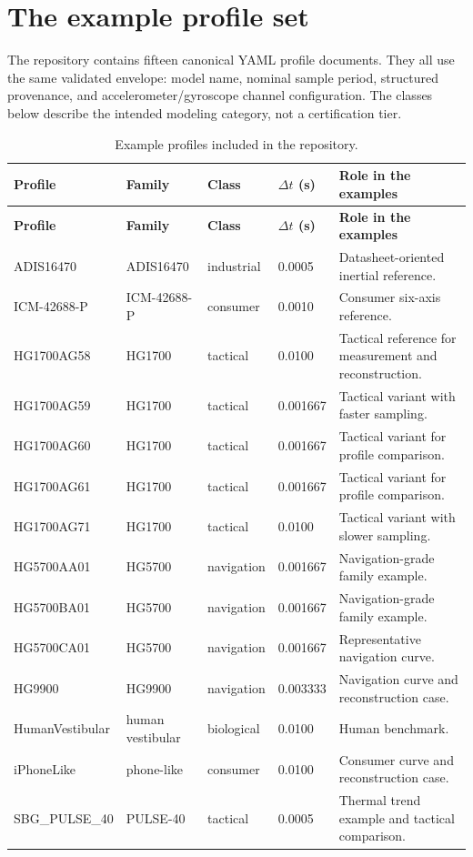 \documentclass[11pt,oneside,headings=big]{scrreprt}
\begin{document}
    \chapter{The example profile set}

    The repository contains fifteen canonical YAML profile documents. They all use
    the same validated  envelope: model name, nominal
    sample period, structured provenance, and accelerometer/gyroscope channel
    configuration. The classes below describe the intended modeling category, not
    a certification tier.

    \begin{longtable}{@{}L{1.35in}L{1.18in}L{0.92in}C{0.72in}p{1.95in}@{}}
        \caption{Example profiles included in the repository.}\label{tab:profiles}\\
        \toprule
        \textbf{Profile} & \textbf{Family} & \textbf{Class} & \textbf{$\Delta t$ (s)} & \textbf{Role in the examples} \\
        \midrule
        \endfirsthead
        \toprule
        \textbf{Profile} & \textbf{Family} & \textbf{Class} & \textbf{$\Delta t$ (s)} & \textbf{Role in the examples} \\
        \midrule
        \endhead
        \bottomrule
        \endfoot
        ADIS16470 & ADIS16470 & industrial & 0.0005 & Datasheet-oriented inertial reference. \\
        ICM-42688-P & ICM-42688-P & consumer & 0.0010 & Consumer six-axis reference. \\
        HG1700AG58 & HG1700 & tactical & 0.0100 & Tactical reference for measurement and reconstruction. \\
        HG1700AG59 & HG1700 & tactical & 0.001667 & Tactical variant with faster sampling. \\
        HG1700AG60 & HG1700 & tactical & 0.001667 & Tactical variant for profile comparison. \\
        HG1700AG61 & HG1700 & tactical & 0.001667 & Tactical variant for profile comparison. \\
        HG1700AG71 & HG1700 & tactical & 0.0100 & Tactical variant with slower sampling. \\
        HG5700AA01 & HG5700 & navigation & 0.001667 & Navigation-grade family example. \\
        HG5700BA01 & HG5700 & navigation & 0.001667 & Navigation-grade family example. \\
        HG5700CA01 & HG5700 & navigation & 0.001667 & Representative navigation curve. \\
        HG9900 & HG9900 & navigation & 0.003333 & Navigation curve and reconstruction case. \\
        HumanVestibular & human vestibular & biological & 0.0100 & Human benchmark. \\
        iPhoneLike & phone-like & consumer & 0.0100 & Consumer curve and reconstruction case. \\
        SBG\_PULSE\_40 & PULSE-40 & tactical & 0.0005 & Thermal trend example and tactical comparison. \\
    \end{longtable}
\end{document}
